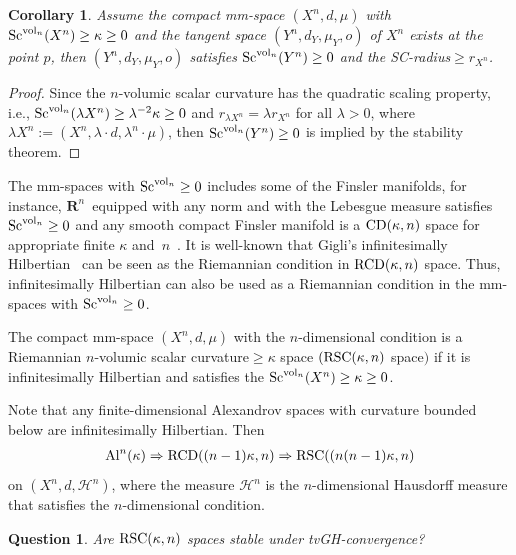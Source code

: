 \documentclass[pdftex]{sigma}
\newtheorem{Question}[Theorem]{Question}
\newtheorem{Corollary}[Theorem]{Corollary}
\begin{document}
\begin{Corollary}Assume the compact mm-space $(X^n,d,\mu)$ with ${\rm Sc}^{{\rm vol}_n}(X^n)\geq\kappa\geq 0$ and the tangent space $(Y^n,d_Y,\mu_Y, o)$ of $X^n$ exists at the point $p$, then $(Y^n,d_Y,\mu_Y, o)$ satisfies ${\rm Sc}^{{\rm vol}_n}(Y^n)\allowbreak\geq 0$ and the SC-radius$\geq r_{X^n}$.
\end{Corollary}

\begin{proof}
Since the $n$-volumic scalar curvature has the quadratic scaling property, i.e., ${\rm Sc}^{{\rm vol}_n}(\lambda X^n)\allowbreak \geq \lambda ^{-2}\kappa \geq 0$ and $r_{\lambda X^n}=\lambda r_{X^n}$ for all $\lambda>0$, where $\lambda X^n:=(X^n, \lambda \cdot d,\lambda^n \cdot \mu)$, then ${\rm Sc}^{{\rm vol}_n}(Y^n)\geq 0$ is implied by the stability theorem.
\end{proof}

The mm-spaces with ${\rm Sc}^{{\rm vol}_n}\geq 0$ includes some of the Finsler manifolds, for instance, $\mathbf{R}^n$~equip\-ped with any norm and with the Lebesgue measure satisfies ${\rm Sc}^{{\rm vol}_n}\geq 0$ and any smooth compact Finsler manifold is a ${\rm CD}(\kappa, n)$ space for appropriate finite $\kappa$ and~$n$~\cite{MR2546027}. It is well-known that Gigli's infinitesimally Hilbertian~\cite{MR3381131} can be seen as the Riemannian condition in ${\rm RCD}(\kappa, n)$ space. Thus, infinitesimally Hilbertian can also be used as a Riemannian condition in the mm-spaces with ${\rm Sc}^{{\rm vol}_n}\geq 0$.

\begin{Definition}
The compact mm-space $(X^n,d,\mu)$ with the $n$-dimensional condition is a Riemannian $n$-volumic scalar curvature$\geq\kappa$ space $({\rm RSC}(\kappa, n)$ space$)$ if it is infinitesimally Hilbertian and satisfies the ${\rm Sc}^{{\rm vol}_n}(X^n)\geq\kappa\geq 0$.
\end{Definition}

Note that any finite-dimensional Alexandrov spaces with curvature bounded below are infinitesimally Hilbertian. Then
\begin{gather*}
{\rm Al}^n(\kappa)\Rightarrow {\rm RCD}((n-1)\kappa, n)\Rightarrow {\rm RSC}((n(n-1)\kappa, n)
\end{gather*}
 on $(X^n,d,\mathcal{H}^n)$, where the measure $\mathcal{H}^n$ is the $n$-dimensional Hausdorff measure that satisfies the $n$-dimensional condition.

\begin{Question} Are ${\rm RSC}(\kappa, n)$ spaces stable under tvGH-convergence?
\end{Question}
\end{document}
